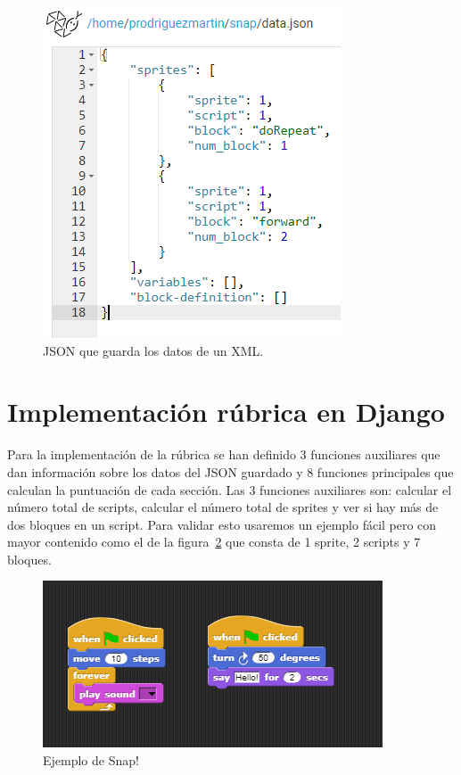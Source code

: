 \documentclass[a4paper, 12pt]{book}
\begin{document}
 \begin{figure}[h]
            \centering
            \includegraphics[scale=0.55]{img/json.PNG}
            \caption{JSON que guarda los datos de un XML.}
            \label{figura:JSON}
        \end{figure}
 
 \section{Implementación rúbrica en Django}
 Para la implementación de la rúbrica se han definido 3 funciones auxiliares que dan información sobre  los datos del JSON guardado y 8 funciones principales que calculan la puntuación de cada sección. Las 3 funciones auxiliares son: calcular el número total de scripts, calcular el número total de sprites y ver si hay más de dos bloques en un script. Para validar esto usaremos un ejemplo fácil pero con mayor contenido como el de la figura~\ref{figura:snap-ej} que consta de 1 sprite, 2 scripts y 7 bloques.
    \begin{figure}[h]
            \centering
            \includegraphics[scale=0.6]{img/ej_rubrica.PNG}
            \caption{Ejemplo de Snap!}
            \label{figura:snap-ej}
        \end{figure}
        
\end{document}
